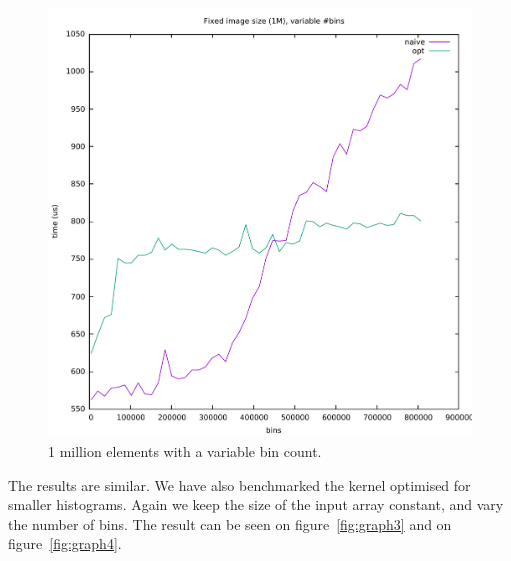 \documentclass[12pt, a4paper, hidelinks]{article}
\begin{document}
\begin{figure}[htpb]
    \centering
    \includegraphics[width=0.6\linewidth]{img/graphs/1M-varbins.pdf}
    \caption{1 million elements with a variable bin count.}
    \label{fig:graph2}
\end{figure}

The results are similar.
We have also benchmarked the kernel optimised for smaller histograms. Again we keep the size of the input array constant, and vary the number of bins. The result can be seen on figure~\ref{fig:graph3} and on figure~\ref{fig:graph4}.
\end{document}
